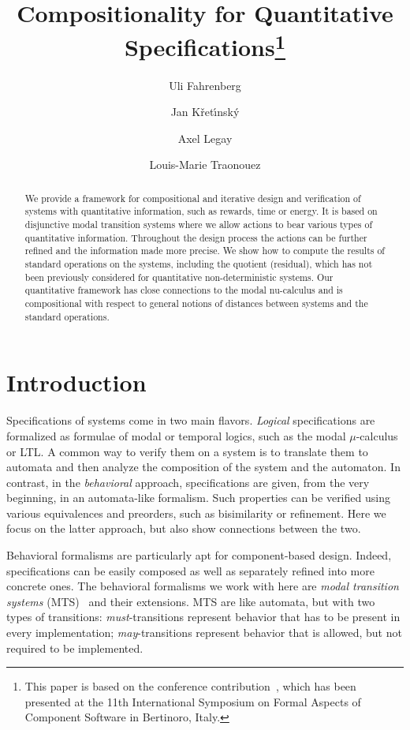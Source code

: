 \documentclass[twocolumn]{svjour3-dummy}
\title{Compositionality for Quantitative Specifications\thanks{This paper is based on the conference
    contribution~\cite{DBLP:conf/facs2/FahrenbergKLT14}, which has been
    presented at the 11th International Symposium on Formal Aspects of
    Component Software in Bertinoro, Italy.}}
\author{Uli Fahrenberg \and Jan K{\v r}et{\'\i}nsk{\'y} \and
  Axel Legay \and Louis-Marie Traonouez}
\institute{Uli Fahrenberg \and Axel Legay \and Louis-Marie Traonouez
  \at Irisa / Inria Rennes \and Jan K{\v r}et{\'\i}nsk{\'y} \at
  Technical University of Munich}
\begin{document}
\maketitle

\begin{abstract}
  We provide a framework for compositional and iterative design and
  verification of systems with quantitative information, such as
  rewards, time or energy. It is based on disjunctive modal transition
  systems where we allow actions to bear various types of quantitative
  information. Throughout the design process the actions can be further
  refined and the information made more precise. We show how to compute
  the results of standard operations on the systems, including the
  quotient (residual), which has not been previously considered for
  quantitative non-deterministic systems. Our quantitative framework has
  close connections to the modal nu-calculus and is compositional with
  respect to general notions of distances between systems and the
  standard operations.
\end{abstract}

\section{Introduction}
\label{sec:intro}

Specifications of systems come in two main flavors. \emph{Logical}
specifications are formalized as formulae of modal or temporal logics,
such as the modal $\mu$-calculus or LTL. A common way to verify them on
a system is to translate them to automata and then analyze the
composition of the system and the automaton. In contrast, in the
\emph{behavioral} approach, specifications are given, from the very
beginning, in an automata-like formalism. Such properties can be
verified using various equivalences and preorders, such as bisimilarity
or refinement.  Here we focus on the latter approach, but also show
connections between the two.

Behavioral formalisms are particularly apt for com\-ponent-based design.
Indeed, specifications can be easily composed as well as separately
refined into more concrete ones.  The behavioral formalisms we work with
here are \emph{modal transition systems}
(MTS)~\cite{DBLP:conf/lics/LarsenT88} and their extensions. MTS are like
automata, but with two types of transitions: \emph{must}-transitions
represent behavior that has to be present in every implementation;
\emph{may}-tran\-sitions represent behavior that is allowed, but not
required to be implemented.
\end{document}
